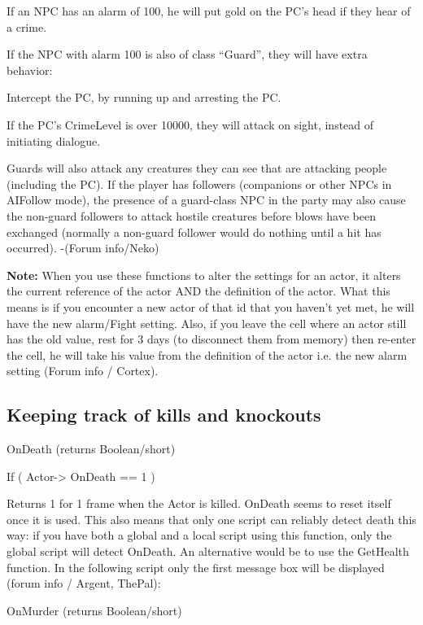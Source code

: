 If an NPC has an alarm of 100, he will put gold on the PC's head if they
hear of a crime.

If the NPC with alarm 100 is also of class ``Guard'', they will have
extra behavior:

Intercept the PC, by running up and arresting the PC.

If the PC's CrimeLevel is over 10000, they will attack on sight, instead
of initiating dialogue.

Guards will also attack any creatures they can see that are attacking
people (including the PC). If the player has followers (companions or
other NPCs in AIFollow mode), the presence of a guard-class NPC in the
party may also cause the non-guard followers to attack hostile creatures
before blows have been exchanged (normally a non-guard follower would do
nothing until a hit has occurred). -(Forum info/Neko)

\textbf{Note:} When you use these functions to alter the settings for an
actor, it alters the current reference of the actor AND the definition
of the actor. What this means is if you encounter a new actor of that id
that you haven't yet met, he will have the new alarm/Fight setting.
Also, if you leave the cell where an actor still has the old value, rest
for 3 days (to disconnect them from memory) then re-enter the cell, he
will take his value from the definition of the actor i.e. the new alarm
setting (Forum info / Cortex).

\hypertarget{keeping-track-of-kills-and-knockouts}{%
\subsection{Keeping track of kills and
knockouts}\label{keeping-track-of-kills-and-knockouts}}

OnDeath (returns Boolean/short)

If ( Actor-> OnDeath == 1 )

Returns 1 for 1 frame when the Actor is killed. OnDeath seems to reset
itself once it is used. This also means that only one script can
reliably detect death this way: if you have both a global and a local
script using this function, only the global script will detect OnDeath.
An alternative would be to use the GetHealth function. In the following
script only the first message box will be displayed (forum info /
Argent, ThePal):



OnMurder (returns Boolean/short)

